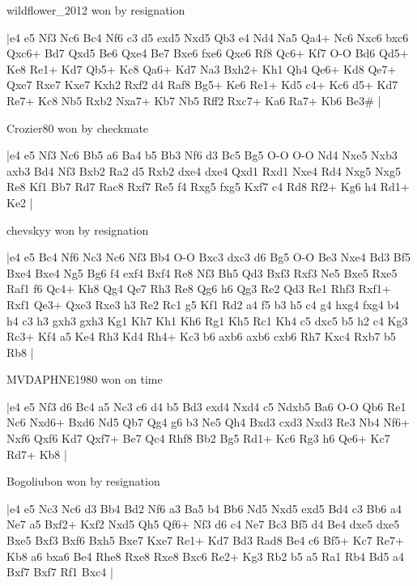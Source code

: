 \showboard

wildflower\_2012 won by resignation

\makegametitle
|e4 e5 Nf3 Nc6 Bc4 Nf6 c3 d5 exd5 Nxd5 Qb3 e4 Nd4 Na5 Qa4+ Nc6 Nxc6 bxc6 Qxc6+ Bd7 Qxd5 Be6 Qxe4 Be7 Bxe6 fxe6 Qxe6 Rf8 Qc6+ Kf7 O-O Bd6 Qd5+ Ke8 Re1+ Kd7 Qb5+ Kc8 Qa6+ Kd7 Na3 Bxh2+ Kh1 Qh4 Qe6+ Kd8 Qe7+ Qxe7 Rxe7 Kxe7 Kxh2 Rxf2 d4 Raf8 Bg5+ Ke6 Re1+ Kd5 c4+ Kc6 d5+ Kd7 Re7+ Kc8 Nb5 Rxb2 Nxa7+ Kb7 Nb5 Rff2 Rxc7+ Ka6 Ra7+ Kb6 Be3\#  |

\showboard

Crozier80 won by checkmate

\makegametitle
|e4 e5 Nf3 Nc6 Bb5 a6 Ba4 b5 Bb3 Nf6 d3 Bc5 Bg5 O-O O-O Nd4 Nxe5 Nxb3 axb3 Bd4 Nf3 Bxb2 Ra2 d5 Rxb2 dxe4 dxe4 Qxd1 Rxd1 Nxe4 Rd4 Nxg5 Nxg5 Re8 Kf1 Bb7 Rd7 Rac8 Rxf7 Re5 f4 Rxg5 fxg5 Kxf7 c4 Rd8 Rf2+ Kg6 h4 Rd1+ Ke2  |

\showboard

chevskyy won by resignation

\makegametitle
|e4 e5 Bc4 Nf6 Nc3 Nc6 Nf3 Bb4 O-O Bxc3 dxc3 d6 Bg5 O-O Be3 Nxe4 Bd3 Bf5 Bxe4 Bxe4 Ng5 Bg6 f4 exf4 Bxf4 Re8 Nf3 Bh5 Qd3 Bxf3 Rxf3 Ne5 Bxe5 Rxe5 Raf1 f6 Qc4+ Kh8 Qg4 Qe7 Rh3 Re8 Qg6 h6 Qg3 Re2 Qd3 Re1 Rhf3 Rxf1+ Rxf1 Qe3+ Qxe3 Rxe3 h3 Re2 Rc1 g5 Kf1 Rd2 a4 f5 b3 h5 c4 g4 hxg4 fxg4 b4 h4 c3 h3 gxh3 gxh3 Kg1 Kh7 Kh1 Kh6 Rg1 Kh5 Rc1 Kh4 c5 dxc5 b5 h2 c4 Kg3 Rc3+ Kf4 a5 Ke4 Rh3 Kd4 Rh4+ Kc3 b6 axb6 axb6 cxb6 Rh7 Kxc4 Rxb7 b5 Rb8  |

\showboard

MVDAPHNE1980 won on time

\makegametitle
|e4 e5 Nf3 d6 Bc4 a5 Nc3 c6 d4 b5 Bd3 exd4 Nxd4 c5 Ndxb5 Ba6 O-O Qb6 Re1 Nc6 Nxd6+ Bxd6 Nd5 Qb7 Qg4 g6 b3 Ne5 Qh4 Bxd3 cxd3 Nxd3 Re3 Nb4 Nf6+ Nxf6 Qxf6 Kd7 Qxf7+ Be7 Qc4 Rhf8 Bb2 Bg5 Rd1+ Kc6 Rg3 h6 Qe6+ Kc7 Rd7+ Kb8  |

\showboard

Bogoliubon won by resignation

\makegametitle
|e4 e5 Nc3 Nc6 d3 Bb4 Bd2 Nf6 a3 Ba5 b4 Bb6 Nd5 Nxd5 exd5 Bd4 c3 Bb6 a4 Ne7 a5 Bxf2+ Kxf2 Nxd5 Qh5 Qf6+ Nf3 d6 c4 Ne7 Bc3 Bf5 d4 Be4 dxe5 dxe5 Bxe5 Bxf3 Bxf6 Bxh5 Bxe7 Kxe7 Re1+ Kd7 Bd3 Rad8 Be4 c6 Bf5+ Kc7 Re7+ Kb8 a6 bxa6 Be4 Rhe8 Rxe8 Rxe8 Bxc6 Re2+ Kg3 Rb2 b5 a5 Ra1 Rb4 Bd5 a4 Bxf7 Bxf7 Rf1 Bxc4  |

